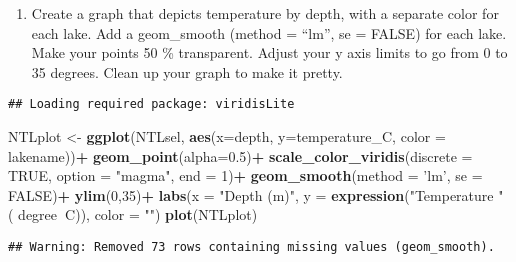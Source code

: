 \documentclass[]{article}
\newenvironment{Shaded}{\begin{snugshade}}{\end{snugshade}}
\newcommand{\KeywordTok}[1]{\textcolor[rgb]{0.13,0.29,0.53}{\textbf{#1}}}
\newcommand{\DataTypeTok}[1]{\textcolor[rgb]{0.13,0.29,0.53}{#1}}
\newcommand{\DecValTok}[1]{\textcolor[rgb]{0.00,0.00,0.81}{#1}}
\newcommand{\FloatTok}[1]{\textcolor[rgb]{0.00,0.00,0.81}{#1}}
\newcommand{\StringTok}[1]{\textcolor[rgb]{0.31,0.60,0.02}{#1}}
\newcommand{\CommentTok}[1]{\textcolor[rgb]{0.56,0.35,0.01}{\textit{#1}}}
\newcommand{\OtherTok}[1]{\textcolor[rgb]{0.56,0.35,0.01}{#1}}
\newcommand{\OperatorTok}[1]{\textcolor[rgb]{0.81,0.36,0.00}{\textbf{#1}}}
\newcommand{\NormalTok}[1]{#1}
\providecommand{\tightlist}{%
  \setlength{\itemsep}{0pt}\setlength{\parskip}{0pt}}
\begin{document}
\begin{enumerate}
\def\labelenumi{\arabic{enumi}.}
\setcounter{enumi}{7}
\tightlist
\item
  Create a graph that depicts temperature by depth, with a separate
  color for each lake. Add a geom\_smooth (method = ``lm'', se = FALSE)
  for each lake. Make your points 50 \% transparent. Adjust your y axis
  limits to go from 0 to 35 degrees. Clean up your graph to make it
  pretty.
\end{enumerate}

\begin{Shaded}
\end{Shaded}

\begin{verbatim}
## Loading required package: viridisLite
\end{verbatim}

\begin{Shaded}
\begin{Highlighting}[]
\NormalTok{NTLplot <-}\StringTok{ }\KeywordTok{ggplot}\NormalTok{(NTLsel, }\KeywordTok{aes}\NormalTok{(}\DataTypeTok{x=}\NormalTok{depth, }\DataTypeTok{y=}\NormalTok{temperature_C, }\DataTypeTok{color =}\NormalTok{ lakename))}\OperatorTok{+}
\StringTok{  }\KeywordTok{geom_point}\NormalTok{(}\DataTypeTok{alpha=}\FloatTok{0.5}\NormalTok{)}\OperatorTok{+}
\StringTok{  }\KeywordTok{scale_color_viridis}\NormalTok{(}\DataTypeTok{discrete =} \OtherTok{TRUE}\NormalTok{, }\DataTypeTok{option =} \StringTok{"magma"}\NormalTok{, }\DataTypeTok{end =} \DecValTok{1}\NormalTok{)}\OperatorTok{+}
\StringTok{  }\KeywordTok{geom_smooth}\NormalTok{(}\DataTypeTok{method =} \StringTok{'lm'}\NormalTok{, }\DataTypeTok{se =} \OtherTok{FALSE}\NormalTok{)}\OperatorTok{+}
\StringTok{  }\KeywordTok{ylim}\NormalTok{(}\DecValTok{0}\NormalTok{,}\DecValTok{35}\NormalTok{)}\OperatorTok{+}
\StringTok{  }\KeywordTok{labs}\NormalTok{(}\DataTypeTok{x =} \StringTok{"Depth (m)"}\NormalTok{, }\DataTypeTok{y =} \KeywordTok{expression}\NormalTok{(}\StringTok{"Temperature "}\NormalTok{ ( degree}\OperatorTok{~}\NormalTok{C)), }\DataTypeTok{color =} \StringTok{""}\NormalTok{)}
\KeywordTok{plot}\NormalTok{(NTLplot)  }
\end{Highlighting}
\end{Shaded}

\begin{verbatim}
## Warning: Removed 73 rows containing missing values (geom_smooth).
\end{verbatim}
\end{document}
